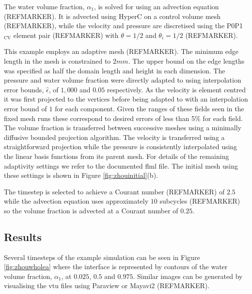 The water volume fraction, $\alpha_1$, is solved for using an advection equation (REFMARKER).  It is advected using HyperC on a control volume mesh (REFMARKER), while the velocity and pressure are discretised using the P0P1$_{\text{CV}}$ element pair (REFMARKER) with $\theta=1/2$ and $\theta_i=1/2$ (REFMARKER).  

This example employs an adaptive mesh (REFMARKER). The minimum edge length in the mesh is constrained to $2mm$. The upper bound on the edge lengths was specified as half the domain length and height in each dimension.  The pressure and water volume fraction were directly adapted to using interpolation error bounds, $\hat{\epsilon}$, of $1,000$ and $0.05$ respectively.  As the velocity is element centred it was first projected to the vertices before being adapted to with an interpolation error bound of $1$ for each component.  Given the ranges of these fields seen in the fixed mesh runs these correspond to desired errors of less than 5\% for each field. The volume fraction is transferred between successive meshes using a minimally diffusive bounded projection algorithm.  The velocity is transferred using a straightforward projection while the pressure is consistently interpolated using the linear basis functions from its parent mesh. For details of the remaining adaptivity settings we refer to the documented flml file.  The initial mesh using these settings is shown in Figure \ref{fig:zhouinitial}(b). 

The timestep is selected to achieve a Courant number (REFMARKER) of $2.5$ while the advection equation uses approximately $10$ subcycles (REFMARKER) so the volume fraction is advected at a Courant number of $0.25$.  

\subsection{Results}
Several timesteps of the example simulation can be seen in Figure \ref{fig:zhouwholea} where the interface is represented by contours of the water volume fraction, $\alpha_1$, at $0.025$, $0.5$ and $0.975$.  Similar images can be generated by visualising the vtu files using Paraview or Mayavi2 (REFMARKER).

